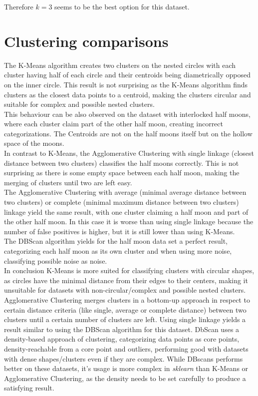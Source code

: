 \documentclass[a4paper, 11pt]{article}
\begin{document}
Therefore $k=3$ seems to be the best option for this dataset.

\section{Clustering comparisons}

The K-Means algorithm creates two clusters on the nested circles with each cluster having half of each circle and their centroids being diametrically opposed on the inner circle. This result is not surprising as the K-Means algorithm finds clusters as the closest data points to a centroid, making the clusters circular and suitable for complex and possible nested clusters.\\
This behaviour can be also observed on the dataset with interlocked half moons, where each cluster claim part of the other half moon, creating incorrect categorizations. The Centroids are not on the half moons itself but on the hollow space of the moons.\\
In contrast to K-Means, the Agglomerative Clustering with single linkage (closest distance between two clusters) classifies the half moons correctly. This is not surprising as there is some empty space between each half moon, making the merging of clusters until two are left easy.\\
The Agglomerative Clustering with average (minimal average distance between two clusters) or complete (minimal maximum distance between two clusters) linkage yield the same result, with one cluster claiming a half moon and part of the other half moon. In this case it is worse than using single linkage because the number of false positives is higher, but it is still lower than using K-Means.\\
The DBScan algorithm yields for the half moon data set a perfect result, categorizing each half moon as its own cluster and when using more noise, classifying possible noise as noise.\\
In conclusion K-Means is more suited for classifying clusters with circular shapes, as circles have the minimal distance from their edges to their centers, making it unsuitable for datasets with non-circular/complex and possible nested clusters. Agglomerative Clustering merges clusters in a bottom-up approach in respect to certain distance criteria (like single, average or complete distance) between two clusters until a certain number of clusters are left. Using single linkage yields a result similar to using the DBScan algorithm for this dataset.
DbScan uses a density-based approach of clustering, categorizing data points as core points, density-reachable from a core point and outliers, performing good with datasets with dense shapes/clusters even if they are complex. While DBscans performs better on these datasets, it's usage is more complex in \textit{sklearn} than K-Means or Agglomerative Clustering, as the density needs to be set carefully to produce a satisfying result.
\end{document}
